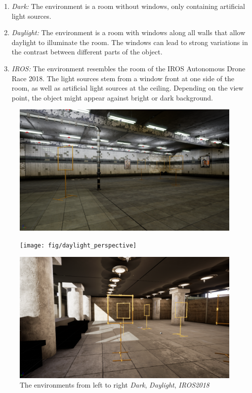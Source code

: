 \begin{enumerate}
	\item \textit{Dark:} The environment is a room without windows, only containing artificial light sources. 
	\item \textit{Daylight:} The environment is a room with windows along all walls that allow daylight to illuminate the room. The windows can lead to strong variations in the contrast between different parts of the object.
	\item \textit{IROS:} The environment resembles the room of the \ac{IROS} Autonomous Drone Race 2018. The light sources stem from a window front at one side of the room, as well as artificial light sources at the ceiling. Depending on the view point, the object might appear against bright or dark background.
\end{enumerate}
\begin{figure}[hbtp]
	\centering
	\begin{minipage}{0.3\textwidth}
		\includegraphics[width=\textwidth]{fig/basement_perspective}
	\end{minipage}
	\begin{minipage}{0.3\textwidth}
		\texttt{[image: fig/daylight\_perspective]}
	\end{minipage}
	\begin{minipage}{0.3\textwidth}
		\includegraphics[width=\textwidth]{fig/iros_perspective}
	\end{minipage}
	\caption{The environments from left to right \textit{Dark}, \textit{Daylight}, \textit{IROS2018}}
	\label{fig:environments}
\end{figure}


